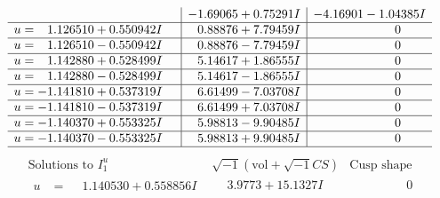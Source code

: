\documentclass[1p]{elsarticle_modified}
\theoremstyle{definition}
\newcommand{\I}{\sqrt{-1}}
\begin{document}
$$\begin{array}{c|c|c}
 & -1.69065 + 0.75291 I & -4.16901 - 1.04385 I \\ \hline\begin{aligned}
u &= \phantom{-}1.126510 + 0.550942 I\end{aligned}
 & \phantom{-}0.88876 + 7.79459 I & \phantom{-0.000000 } 0 \\ \hline\begin{aligned}
u &= \phantom{-}1.126510 - 0.550942 I\end{aligned}
 & \phantom{-}0.88876 - 7.79459 I & \phantom{-0.000000 } 0 \\ \hline\begin{aligned}
u &= \phantom{-}1.142880 + 0.528499 I\end{aligned}
 & \phantom{-}5.14617 + 1.86555 I & \phantom{-0.000000 } 0 \\ \hline\begin{aligned}
u &= \phantom{-}1.142880 - 0.528499 I\end{aligned}
 & \phantom{-}5.14617 - 1.86555 I & \phantom{-0.000000 } 0 \\ \hline\begin{aligned}
u &= -1.141810 + 0.537319 I\end{aligned}
 & \phantom{-}6.61499 - 7.03708 I & \phantom{-0.000000 } 0 \\ \hline\begin{aligned}
u &= -1.141810 - 0.537319 I\end{aligned}
 & \phantom{-}6.61499 + 7.03708 I & \phantom{-0.000000 } 0 \\ \hline\begin{aligned}
u &= -1.140370 + 0.553325 I\end{aligned}
 & \phantom{-}5.98813 - 9.90485 I & \phantom{-0.000000 } 0 \\ \hline\begin{aligned}
u &= -1.140370 - 0.553325 I\end{aligned}
 & \phantom{-}5.98813 + 9.90485 I & \phantom{-0.000000 } 0\\
 \hline 
 \end{array}$$\newpage$$\begin{array}{c|c|c}  
\text{Solutions to }I^u_{1}& \I (\text{vol} + \sqrt{-1}CS) & \text{Cusp shape}\\
 \hline 
\begin{aligned}
u &= \phantom{-}1.140530 + 0.558856 I\end{aligned}
 & \phantom{-}3.9773 + 15.1327 I & \phantom{-0.000000 } 0 \\ \hline\begin{aligned}

\end{aligned}
\end{array}$$
\end{document}
